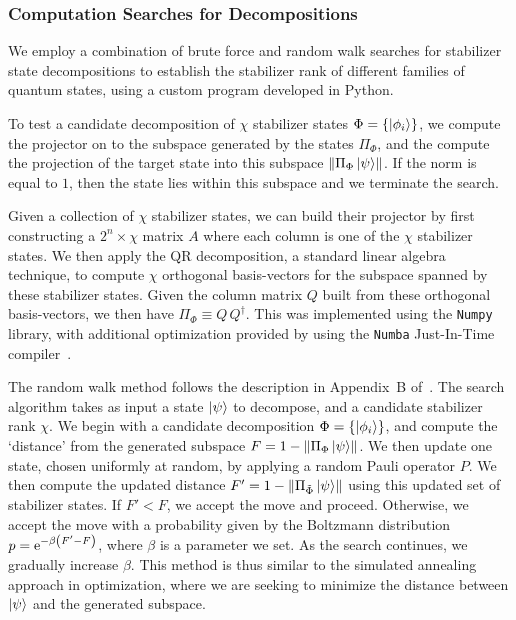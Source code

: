 \subsubsection*{Computation Searches for Decompositions}
We employ a combination of brute force and random walk searches for stabilizer state decompositions to establish the stabilizer rank of different families of quantum states, using a custom program developed in Python.\par
To test a candidate decomposition of $\chi$ stabilizer states $\Phi=\{\ket{\phi_{i}}\}$, we compute the projector on to the subspace generated by the states $\Pi_{\Phi}$, and the compute the projection of the target state into this subspace $\norm{\Pi_{\Phi}\ket{\psi}}$. If the norm is equal to $1$, then the state lies within this subspace and we terminate the search.\par
Given a collection of $\chi$ stabilizer states, we can build their projector by first constructing a $2^{n}\times \chi$ matrix $A$ where each column is one of the $\chi$ stabilizer states. We then apply the QR decomposition, a standard linear algebra technique, to compute $\chi$ orthogonal basis-vectors for the subspace spanned by these stabilizer states. Given the column matrix $Q$ built from these orthogonal basis-vectors, we then have $\Pi_{\Phi}\equiv Q\,Q^{\dagger}$. This was implemented using the \texttt{Numpy} library, with additional optimization provided by using the \texttt{Numba} Just-In-Time compiler~\cite{Numpy,Numba}.\par
The random walk method follows the description in Appendix~B of~\cite{Bravyi2015}. The search algorithm takes as input a state $\ket{\psi}$ to decompose, and a candidate stabilizer rank $\chi$. We begin with a candidate decomposition $\Phi=\{\ket{\phi_{i}}\}$, and compute the `distance' from the generated subspace $F=1-\norm{\Pi_{\Phi}\ket{\psi}}$. We then update one state, chosen uniformly at random, by applying a random Pauli operator $P$. We then compute the updated distance $F'=1-\norm{\Pi_{\tilde{\Phi}}\ket{\psi}}$ using this updated set of stabilizer states. If $F'<F$, we accept the move and proceed. Otherwise, we accept the move with a probability given by the Boltzmann distribution $p=\mathrm{e}^{-\beta\left(F'-F\right)}$, where $\beta$ is a parameter we set. As the search continues, we gradually increase $\beta$. This method is thus similar to the simulated annealing approach in optimization, where we are seeking to minimize the distance between $\ket{\psi}$ and the generated subspace.\par
